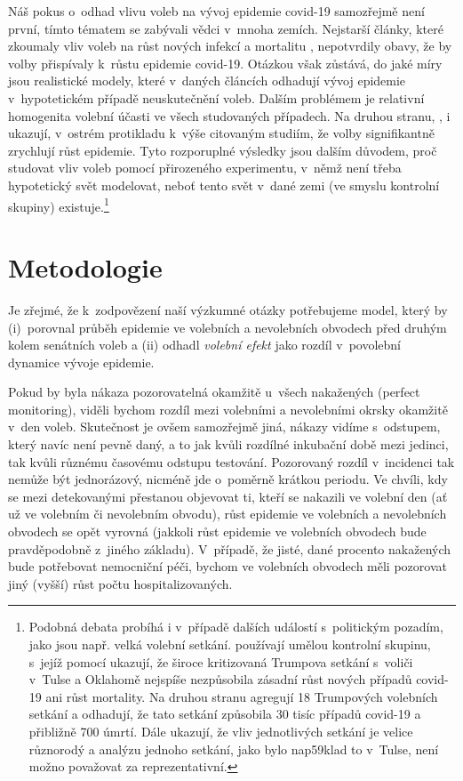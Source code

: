 Náš pokus o~odhad vlivu voleb na vývoj epidemie covid-19 samozřejmě není první, tímto tématem se zabývali vědci v~mnoha zemích. Nejstarší články, které zkoumaly vliv voleb na růst nových infekcí a mortalitu \cite{Berry2020, feltham2020no, AJPH2020}, nepotvrdily obavy, že by volby přispívaly k~růstu epidemie covid-19. Otázkou však zůstává, do jaké míry jsou realistické modely, které v~daných článcích odhadují vývoj epidemie v~hypotetickém případě neuskutečnění voleb. Dalším problémem je relativní homogenita volební účasti ve všech studovaných případech. Na druhou stranu, 
\cite{bertoli_france}, \cite{cotti2020relationship} i \cite{Cassan2020} 
ukazují, v~ostrém protikladu k~výše citovaným studiím, že volby signifikantně zrychlují růst epidemie. Tyto rozporuplné výsledky jsou dalším důvodem, proč studovat vliv voleb pomocí přirozeného experimentu, v~němž není třeba hypotetický svět  modelovat, neboť tento svět v~dané zemi (ve smyslu kontrolní skupiny) existuje.\footnote{Podobná debata probíhá i v~případě dalších událostí s~politickým pozadím, jako jsou např. velká volební setkání. \cite{dave2020risk} používají umělou kontrolní skupinu, s~jejíž pomocí ukazují, že široce kritizovaná Trumpova setkání s~voliči v~Tulse a Oklahomě nejspíše nezpůsobila zásadní růst nových případů covid-19 ani růst mortality. Na druhou stranu  \cite{bernheim2020effects} agregují 18 Trumpových volebních setkání a odhadují, že tato setkání způsobila 30 tisíc případů covid-19 a přibližně 700 úmrtí. Dále  \cite{bernheim2020effects} ukazují, že vliv jednotlivých setkání je velice různorodý a analýzu jednoho setkání, jako bylo nap59klad to v~Tulse, není možno považovat za reprezentativní.}


\section*{Metodologie}
Je zřejmé, že k~zodpovězení naší výzkumné otázky potřebujeme model, který by (i)~porovnal průběh epidemie ve volebních a nevolebních obvodech před druhým kolem senátních voleb a (ii) odhadl {\it volební efekt} jako rozdíl v~povolební dynamice vývoje epidemie.

Pokud by byla nákaza pozorovatelná okamžitě u~všech nakažených (perfect monitoring), viděli bychom rozdíl mezi volebními a nevolebními okrsky okamžitě v~den voleb. Skutečnost je ovšem samozřejmě jiná, nákazy vidíme s~odstupem, který navíc není pevně daný, a to jak kvůli rozdílné inkubační době mezi jedinci, tak kvůli různému časovému odstupu testování. Pozorovaný rozdíl v~incidenci tak nemůže být jednorázový, nicméně jde o~poměrně krátkou periodu. Ve chvíli, kdy se mezi detekovanými přestanou objevovat ti, kteří se nakazili ve volební den (ať už ve volebním či nevolebním obvodu), růst epidemie ve volebních a nevolebních obvodech se opět vyrovná (jakkoli růst epidemie ve volebních obvodech bude pravděpodobně z~jiného základu). V~případě, že jisté, dané procento nakažených bude potřebovat nemocniční péči, bychom ve volebních obvodech měli pozorovat jiný (vyšší) růst počtu hospitalizovaných.  

